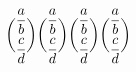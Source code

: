 $
\displaystyle \dbinom{\displaystyle{a\over b}}{\displaystyle{c\over d}}
\textstyle \dbinom{\displaystyle{a\over b}}{\displaystyle{c\over d}}
\scriptstyle \dbinom{\displaystyle{a\over b}}{\displaystyle{c\over d}}
\scriptscriptstyle \dbinom{\displaystyle{a\over b}}{\displaystyle{c\over d}}
$
